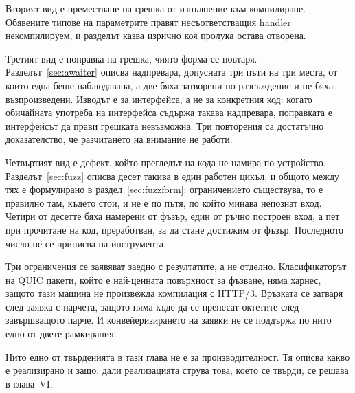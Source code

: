 Вторият вид е преместване на грешка от изпълнение към компилиране. Обявените типове на
параметрите правят несъответстващия handler некомпилируем, и разделът казва изрично коя
пролука остава отворена.

Третият вид е поправка на грешка, чиято форма се повтаря. Разделът~\ref{sec:awaiter} описва
надпревара, допусната три пъти на три места, от които една беше наблюдавана, а две бяха
затворени по разсъждение и не бяха възпроизведени. Изводът е за интерфейса, а не за
конкретния код: когато обичайната употреба на интерфейса съдържа такава надпревара,
поправката е интерфейсът да прави грешката невъзможна. Три повторения са достатъчно
доказателство, че разчитането на внимание не работи.

Четвъртият вид е дефект, който прегледът на кода не намира по устройство.
Разделът~\ref{sec:fuzz} описва десет такива в един работен цикъл, и общото между тях е
формулирано в раздел~\ref{sec:fuzzform}: ограничението съществува, то е правилно там, където
стои, и не е по пътя, по който минава непознат вход. Четири от десетте бяха намерени от
фъзър, един от ръчно построен вход, а пет при прочитане на код, преработван, за да стане
достижим от фъзър. Последното число не се приписва на инструмента.

Три ограничения се заявяват заедно с резултатите, а не отделно. Класификаторът на QUIC
пакети, който е най-ценната повърхност за фъзване, няма харнес, защото тази машина не
произвежда компилация с HTTP/3. Връзката се затваря след заявка с парчета, защото няма къде
да се пренесат октетите след завършващото парче. И конвейеризирането на заявки не се поддържа
по нито едно от двете рамкирания.

Нито едно от твърденията в тази глава не е за производителност. Тя описва какво е
реализирано и защо; дали реализацията струва това, което се твърди, се решава в глава~VI.


